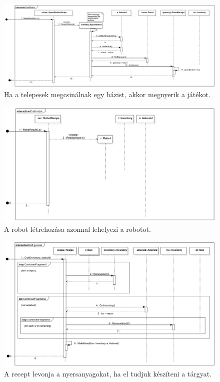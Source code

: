 \begin{figure}[H] 
\centering 
\includegraphics[width=1\textwidth]{docs/3_Project/svg/Design Model!Crafting!CraftStation!CraftStation_20.png} 
\caption{Ha a telepesek megcsinálnak egy bázist, akkor megnyerik a játékot.} 
\end{figure} 

\begin{figure}[H] 
\centering 
\includegraphics[width=1\textwidth]{docs/3_Project/svg/Design Model!Crafting!Craft robot!Craft robot_21.png} 
\caption{A robot létrehozása azonnal lehelyezi a robotot.} 
\end{figure} 

\begin{figure}[H] 
\centering 
\includegraphics[width=1\textwidth]{docs/3_Project/svg/Design Model!Crafting!Craft general!Craft general_22.png} 
\caption{A recept levonja a nyersanyagokat, ha el tudjuk készíteni a tárgyat.} 
\end{figure} 

